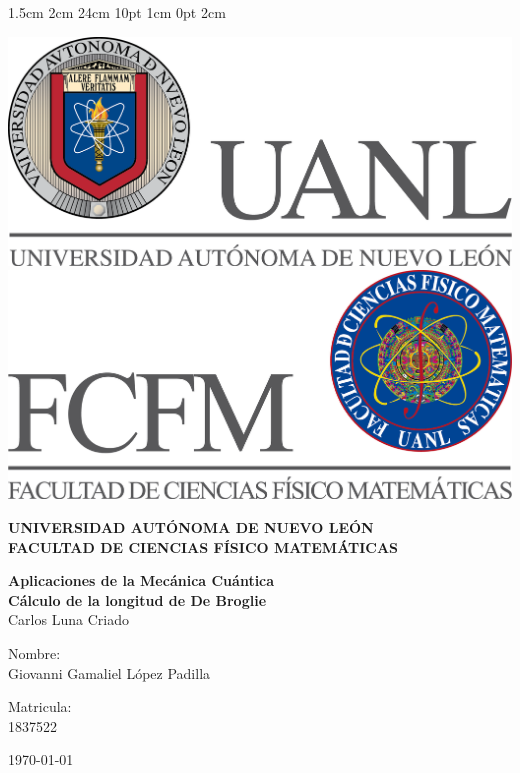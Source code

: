 \documentclass[12pt,letterpaper]{report}
\begin{document}
\setmargins{2.5cm}      
{1.5cm}                     
{2cm}  
{24cm}                    
{10pt}                          
{1cm}                          
{0pt}                             
{2cm}
\begin{titlepage}
\begin{center}
\includegraphics[scale=0.40]{../../Logos/uanl.png} 
\hspace{2.5cm}
\includegraphics[scale=0.40]{../../Logos/fcfm.png}
\end{center}
\vspace{2cm}
\begin{center}
\textbf{
UNIVERSIDAD AUTÓNOMA DE NUEVO LEÓN\\
FACULTAD DE CIENCIAS
FÍSICO MATEMÁTICAS}\\
\vspace*{2cm}
\begin{large}
\vspace{1cm}
\large{\textbf{Aplicaciones de la Mecánica Cuántica}}\\
\textbf{Cálculo de la longitud de De Broglie}\\
Carlos Luna Criado\\
\end{large}
\vspace{3.5cm}
\begin{minipage}{0.6\linewidth}
\vspace{0.5cm}
\changefontsizes{14pt}
Nombre:\\
Giovanni Gamaliel López Padilla\\
\end{minipage}
\begin{minipage}{0.2\linewidth}
\changefontsizes{14pt}
Matricula:\\
1837522
\end{minipage}
\end{center}
\vspace{4cm}
\begin{flushright}
\today
\end{flushright}
\end{titlepage}
\end{document}
